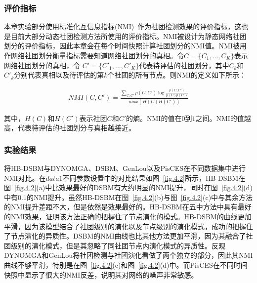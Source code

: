 \subsubsection{评价指标}
本章实验部分使用标准化互信息指标(NMI)~\cite{gong2007machine}作为社团检测效果的评价指标，这也是目前大部分动态社团检测方法所使用的评价指标。NMI被设计为静态网络社团划分的评价指标，因此本章会在每个时间快照计算社团划分的NMI值。NMI被用作网络社团划分衡量指标需要知道网络社团划分的真相。令$C=\{C_1,...,C_K\}$表示网络社团划分的真相，令 $C'=\{C'_1,...,C'_K\}$代表待评估的社团划分，其中$C_k$和$C'_k$分别代表真相以及待评估的第$k$个社团的所有节点。则NMI的定义如下所示：

\begin{equation}
\begin{split}
NMI(C,C')=\frac{\sum_{C,C'}p(C,C')\log \frac{p(C,C')}{p(C)p(C')}}{max(H(C)H(C'))}
\end{split}
\end{equation}

其中，$H(C)$和$H(C')$表示社团$C$和$C'$的熵。NMI的值在$0$到$1$之间。NMI的值越高，代表待评估的社团划分与真相越接近。



\subsubsection{实验结果}

将HB-DSBM与DYNOMGA、DSBM、GenLou以及PisCES在不同数据集中进行NMI对比。在$data1$不同参数设置中的对比结果如图~\ref{fig.4.2}所示，HB-DSBM在图~\ref{fig.4.2}(a)中比效果最好的DSBM有大约明显的NMI提升，同时在图~\ref{fig.4.2}(d)中有$0.1$的NMI提升。虽然HB-DSBM在图~\ref{fig.4.2}(b)与图~\ref{fig.4.2}(c)中与其余方法的NMI提升差距不大，但是依然是效果最好的。HB-DSBM在五中方法中具有最好的NMI效果，证明该方法正确的把握住了节点演化的模式。HB-DSBM的曲线更加平滑，因为该模型结合了社团级别的演化以及节点级别的演化模式，成功的把握住了节点演化的异质性。DSBM的NMI曲线也比其他方法更加平滑，因为其融合了社团级别的演化模式，但是其忽略了同社团节点内演化模式的异质性。反观DYNOMGA和GenLou将社团检测与社团演化看做了两个独立的部分，因此其NMI曲线不够平滑，特别是在图~\ref{fig.4.2}(c)和图~\ref{fig.4.2}(d)中。而PisCES在不同时间快照中显示了很大的NMI反差，说明其对网络的噪声非常敏感。

